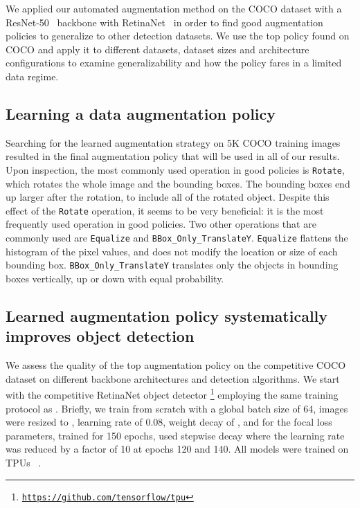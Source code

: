 \documentclass[10pt,twocolumn,letterpaper]{article}
\newcommand{\cmd}[1]{{\tt #1}}
\begin{document}
We applied our automated augmentation method on the COCO dataset with a ResNet-50~\cite{he2016deep} backbone with RetinaNet~\cite{lin2017focal} in order to find good augmentation policies to generalize to other detection datasets. We  use the top policy found on COCO and apply it to different datasets, dataset sizes and architecture configurations to examine generalizability and how the policy fares in a limited data regime. 

\subsection{Learning a data augmentation policy}

Searching for the learned augmentation strategy on 5K COCO training images resulted in the final augmentation policy that will be used in all of our results. Upon inspection, the most commonly used operation in good policies is \cmd{Rotate}, which rotates the whole image and the bounding boxes. The bounding boxes end up larger after the rotation, to include all of the rotated object. Despite this effect of the \cmd{Rotate} operation, it seems to be very beneficial: it is the most frequently used operation in good policies. Two other operations that are commonly used are \cmd{Equalize} and \cmd{BBox\_Only\_TranslateY}. \cmd{Equalize} flattens the histogram of the pixel values, and does not modify the location or size of each bounding box. \cmd{BBox\_Only\_TranslateY} translates only the objects in bounding boxes vertically, up or down with equal probability.


\subsection{Learned augmentation policy systematically improves object detection}
We assess the quality of the top augmentation policy on the competitive COCO dataset \cite{lin2014microsoft} on different backbone architectures and detection algorithms. We start with the competitive RetinaNet object detector
\footnote{{\texttt{\href{}{https://github.com/tensorflow/tpu}}}}
employing the same training protocol as \cite{ghiasi2018dropblock}. Briefly, we train from scratch with a global batch size of 64, images were resized to , learning rate of 0.08, weight decay of ,  and  for the focal loss parameters, trained for 150 epochs, used stepwise decay where the learning rate was reduced by a factor of 10 at epochs 120 and 140.
All models were trained on TPUs ~\cite{jouppi2017datacenter}.
\end{document}
